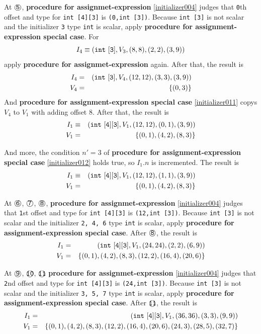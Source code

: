 \begin{Example}
\noindent
At $\MARU{\tt 5}$,
{\bf procedure for assignmet-expression}
\ref{initializer004} judges that
{\tt{0}}th offset and type for {\tt int [4][3]} is
{\tt (0,int [3])}.
Because {\tt int [3]} is not scalar and the initializer {\tt{3}}
type {\tt int} is scalar, apply
{\bf procedure for assignment-expression special case}.
For
\[
I_4 \equiv ({\tt{int\,\,[3]}},V_3,(8,8),(2,2),(3,9))
\]
apply {\bf procedure for assignmet-expression} again.
After that, the result is
\begin{eqnarray*}
I_4 & = & ({\tt{int\,\,[3]}},V_4,(12,12),(3,3),(3,9)) \\
V_4 & = & \{(0,3)\}
\end{eqnarray*}
And 
{\bf procedure for assignment-expression special case} 
\ref{initializer011} copys
$V_4$ to $V_1$ with adding offset $8$.
After that, the result is
\begin{eqnarray*}
I_1 & \equiv & ({\tt{int\,\,[4][3]}}, V_1, (12,12),(0,1),(3,9)) \\
V_1 & = & \{(0,1), (4,2), (8,3)\}
\end{eqnarray*}

And more, the condition $n' = 3$ of
{\bf procedure for assignment-expression special case}
\ref{initializer012} holds true, so
$I_1.n$ is incremented. The result is
\begin{eqnarray*}
I_1 & \equiv & ({\tt{int\,\,[4][3]}}, V_1, (12,12),(1,1),(3,9)) \\
V_1 & = & \{(0,1), (4,2), (8,3)\}
\end{eqnarray*}

\noindent
At $\MARU{\tt 6}$, $\MARU{\tt 7}$, $\MARU{\tt 8}$,
{\bf procedure for assignmet-expression}
\ref{initializer004} judges that
{\tt{1}}st offset and type for {\tt int [4][3]} 
is {\tt (12,int [3])}.
Because {\tt int [3]} is not scalar and the initializer {\tt{2, 4, 6}}
type {\tt int} is scalar, apply
{\bf procedure for assignment-expression special case}.
After $\MARU{\tt 8}$, the result is
\begin{eqnarray*}
I_1 & = & ({\tt{int\,\,[4][3]}},V_1,(24,24),(2,2),(6,9)) \\
V_1 & = & \{
 (0,1),(4,2),(8,3),(12,2),(16,4),(20,6) \}
\end{eqnarray*}

\noindent
At $\MARU{\tt 9}$, $\MARU{\tt 10}$, $\MARU{\tt 11}$
{\bf procedure for assignmet-expression}
\ref{initializer004} judges that
{\tt{2}}nd offset and type for {\tt int [4][3]}
is {\tt (24,int [3])}.
Because {\tt int [3]} is not scalar and the initializer {\tt{3, 5, 7}}
type {\tt int} is scalar, apply
{\bf procedure for assignment-expression special case}.
After $\MARU{\tt 11}$, the result is
\begin{eqnarray*}
I_1 & = & ({\tt{int\,\,[4][3]}},V_1,(36,36),(3,3),(9,9)) \\
V_1 & = & \{
 (0,1),(4,2),(8,3),(12,2),(16,4),(20,6),(24,3),(28,5),(32,7) \}
\end{eqnarray*}


\end{Example}
